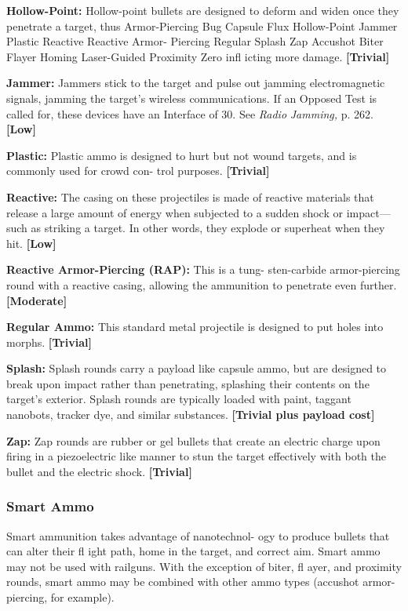\textbf{Hollow-Point:} Hollow-point bullets are designed to 
deform and widen once they penetrate a target, thus 
Armor-Piercing
Bug
Capsule
Flux
Hollow-Point
Jammer
Plastic
Reactive
Reactive Armor-
Piercing
Regular
Splash
Zap
Accushot
Biter
Flayer
Homing
Laser-Guided
Proximity
Zero
infl icting more damage. \textbf{[Trivial]}

\textbf{Jammer:} Jammers stick to the target and pulse out 
jamming electromagnetic signals, jamming the target's 
wireless communications. If an Opposed Test is called 
for, these devices have an Interface of 30. See \textit{Radio }
\textit{Jamming,} p. 262. \textbf{[Low]}

\textbf{Plastic: }Plastic ammo is designed to hurt but not 
wound targets, and is commonly used for crowd con-
trol purposes. \textbf{[Trivial]}

\textbf{Reactive: }The casing on these projectiles is made 
of reactive materials that release a large amount of 
energy when subjected to a sudden shock or impact—
such as striking a target. In other words, they explode 
or superheat when they hit. \textbf{[Low]}

\textbf{Reactive Armor-Piercing (RAP):} This is a tung-
sten-carbide armor-piercing round with a reactive 
casing, allowing the ammunition to penetrate even 
further. \textbf{[Moderate]}

\textbf{Regular Ammo: }This standard metal projectile is 
designed to put holes into morphs. \textbf{[Trivial]}

\textbf{Splash: }Splash rounds carry a payload like capsule 
ammo, but are designed to break upon impact rather 
than penetrating, splashing their contents on the 
target's exterior. Splash rounds are typically loaded 
with paint, taggant nanobots, tracker dye, and similar 
substances. \textbf{[Trivial plus payload cost]}

\textbf{Zap:} Zap rounds are rubber or gel bullets that 
create an electric charge upon firing in a piezoelectric 
like manner to stun the target effectively with both 
the bullet and the electric shock. \textbf{[Trivial]}

\subsubsection{Smart Ammo}

Smart ammunition takes advantage of nanotechnol-
ogy to produce bullets that can alter their fl ight path, 
home in the target, and correct aim. Smart ammo may 
not be used with railguns. With the exception of biter, 
fl ayer, and proximity rounds, smart ammo may be 
combined with other ammo types (accushot armor-
piercing, for example).

